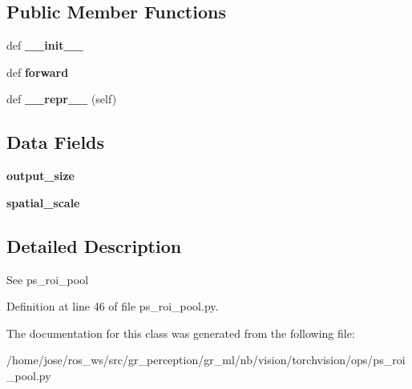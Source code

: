 \subsection*{Public Member Functions}
\begin{DoxyCompactItemize}
\item 
\mbox{\label{classtorchvision_1_1ops_1_1ps__roi__pool_1_1PSRoIPool_ace61c5518801b21cb4b65fe1c9e03685}} 
def {\bfseries \+\_\+\+\_\+init\+\_\+\+\_\+}
\item 
\mbox{\label{classtorchvision_1_1ops_1_1ps__roi__pool_1_1PSRoIPool_aab60e6acd34e3a279e30228cfc7f820e}} 
def {\bfseries forward}
\item 
\mbox{\label{classtorchvision_1_1ops_1_1ps__roi__pool_1_1PSRoIPool_ad7a5e940c22b824f78fd8d4979e00c4f}} 
def {\bfseries \+\_\+\+\_\+repr\+\_\+\+\_\+} (self)
\end{DoxyCompactItemize}
\subsection*{Data Fields}
\begin{DoxyCompactItemize}
\item 
\mbox{\label{classtorchvision_1_1ops_1_1ps__roi__pool_1_1PSRoIPool_a1b0b71801d08cf6016d787fc344e7ff8}} 
{\bfseries output\+\_\+size}
\item 
\mbox{\label{classtorchvision_1_1ops_1_1ps__roi__pool_1_1PSRoIPool_a3cf8582855e35151a393fcb51e4b0076}} 
{\bfseries spatial\+\_\+scale}
\end{DoxyCompactItemize}


\subsection{Detailed Description}
\begin{DoxyVerb}See ps_roi_pool
\end{DoxyVerb}
 

Definition at line 46 of file ps\+\_\+roi\+\_\+pool.\+py.



The documentation for this class was generated from the following file\+:\begin{DoxyCompactItemize}
\item 
/home/jose/ros\+\_\+ws/src/gr\+\_\+perception/gr\+\_\+ml/nb/vision/torchvision/ops/ps\+\_\+roi\+\_\+pool.\+py\end{DoxyCompactItemize}
